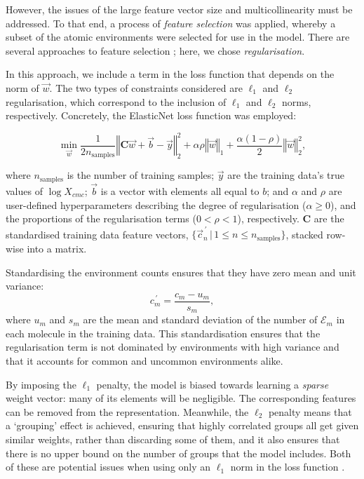 However, the issues of the large feature vector size and multicollinearity must
be addressed. To that end, a process of \emph{feature selection} was applied,
whereby a subset of the atomic environments were selected for use in the model.
There are several approaches to feature selection
\cite{liFeatureSelectionData2017}; here, we chose \emph{regularisation}.

In this approach, we include a term in the loss function that depends on the
norm of $\vec{w}$. The two types of constraints considered are $\ell_1$ and
$\ell_2$ regularisation, which correspond to the inclusion of $\ell_1$ and
$\ell_2$ norms, respectively. Concretely, the ElasticNet
\cite{zouRegularizationVariableSelection2005} loss function was employed:

\begin{equation}
    \label{eq:elastic}
    \min_{\vec{w}} { \frac{1}{2n_{\text{samples}}} \left \Vert \mathbf{C}\vec{w} + \vec{b}- \vec{y} \right \Vert_2 ^ 2 + \alpha\rho \left \Vert \vec{w} \right \Vert_1} + \frac{\alpha(1 - \rho)}{2} \left \Vert \vec{w} \right \Vert_2^2,
\end{equation}

where $n_{\text{samples}}$ is the number of training samples; $\vec{y}$ are the
training data's true values of $\log X_{cmc}$; $\vec{b}$ is a vector with
elements all equal to $b$; and $\alpha$ and $\rho$ are user-defined
hyperparameters describing the degree of regularisation ($\alpha \geq 0$), and
the proportions of the regularisation terms ($0 < \rho < 1$), respectively.
$\mathbf{C}$ are the standardised training data feature vectors,
$\{\vec{c}^{\,\prime}_n \,|\, 1 \leq n \leq n_\text{samples}\}$, stacked
row-wise into a matrix.

Standardising the environment counts ensures that they have zero mean and unit variance:
\begin{equation}
    \label{eq:standard-scaling}
    {c}^{\,\prime}_m = \frac{c_m - u_m}{s_m},
\end{equation}
where $u_m$ and $s_m$ are the mean and standard deviation of the number of
$\mathcal{E}_m$ in each molecule in the training data. This standardisation
ensures that the regularisation term is not dominated by environments with high
variance and that it accounts for common and uncommon environments alike.

By imposing the $\ell_1$ penalty, the model is biased towards learning a
\emph{sparse} weight vector: many of its elements will be negligible. The
corresponding features can be removed from the representation. Meanwhile, the
$\ell_2$ penalty means that a `grouping' effect is achieved, ensuring that
highly correlated groups all get given similar weights, rather than discarding
some of them, and it also ensures that there is no upper bound on the number of
groups that the model includes. Both of these are potential issues when using
only an $\ell_1$ norm in the loss function
\cite{efronLeastAngleRegression2004,zouRegularizationVariableSelection2005}.

